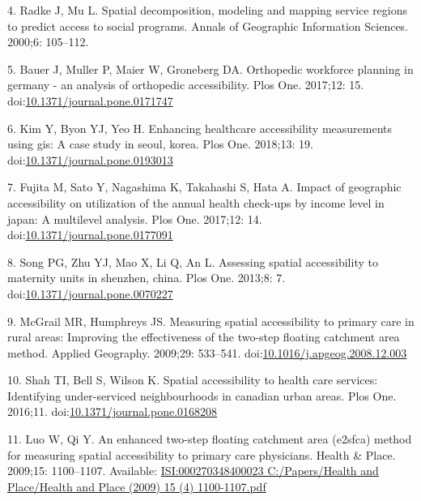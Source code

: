 \documentclass[10pt,letterpaper]{article}
\begin{document}
\hypertarget{ref-Radke2000}{}
4. Radke J, Mu L. Spatial decomposition, modeling and mapping service
regions to predict access to social programs. Annals of Geographic
Information Sciences. 2000;6: 105--112.

\hypertarget{ref-Bauer2017}{}
5. Bauer J, Muller P, Maier W, Groneberg DA. Orthopedic workforce
planning in germany - an analysis of orthopedic accessibility. Plos One.
2017;12: 15.
doi:\href{https://doi.org/10.1371/journal.pone.0171747}{10.1371/journal.pone.0171747}

\hypertarget{ref-Kim2018}{}
6. Kim Y, Byon YJ, Yeo H. Enhancing healthcare accessibility
measurements using gis: A case study in seoul, korea. Plos One. 2018;13:
19.
doi:\href{https://doi.org/10.1371/journal.pone.0193013}{10.1371/journal.pone.0193013}

\hypertarget{ref-Fujita2017}{}
7. Fujita M, Sato Y, Nagashima K, Takahashi S, Hata A. Impact of
geographic accessibility on utilization of the annual health check-ups
by income level in japan: A multilevel analysis. Plos One. 2017;12: 14.
doi:\href{https://doi.org/10.1371/journal.pone.0177091}{10.1371/journal.pone.0177091}

\hypertarget{ref-Song2013}{}
8. Song PG, Zhu YJ, Mao X, Li Q, An L. Assessing spatial accessibility
to maternity units in shenzhen, china. Plos One. 2013;8: 7.
doi:\href{https://doi.org/10.1371/journal.pone.0070227}{10.1371/journal.pone.0070227}

\hypertarget{ref-McGrail2009}{}
9. McGrail MR, Humphreys JS. Measuring spatial accessibility to primary
care in rural areas: Improving the effectiveness of the two-step
floating catchment area method. Applied Geography. 2009;29: 533--541.
doi:\href{https://doi.org/10.1016/j.apgeog.2008.12.003}{10.1016/j.apgeog.2008.12.003}

\hypertarget{ref-Shah2016}{}
10. Shah TI, Bell S, Wilson K. Spatial accessibility to health care
services: Identifying under-serviced neighbourhoods in canadian urban
areas. Plos One. 2016;11.
doi:\href{https://doi.org/10.1371/journal.pone.0168208}{10.1371/journal.pone.0168208}

\hypertarget{ref-Luo2009}{}
11. Luo W, Qi Y. An enhanced two-step floating catchment area (e2sfca)
method for measuring spatial accessibility to primary care physicians.
Health \& Place. 2009;15: 1100--1107. Available:
\href{ISI:000270348400023\%0AC:/Papers/Health\%20and\%20Place/Health\%20and\%20Place\%20(2009)\%2015\%20(4)\%201100-1107.pdf}{ISI:000270348400023
C:/Papers/Health and Place/Health and Place (2009) 15 (4) 1100-1107.pdf}
\end{document}
